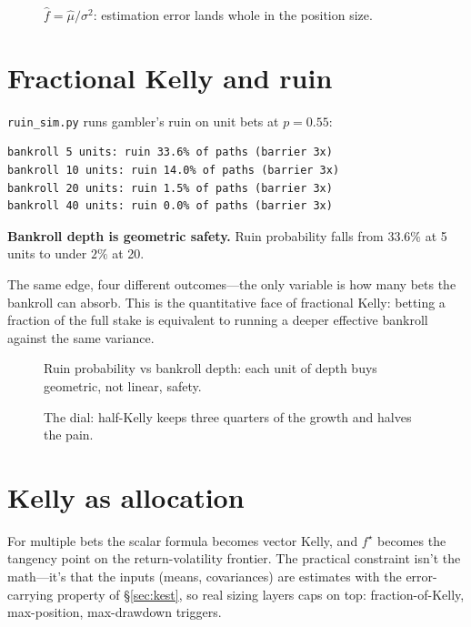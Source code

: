 \begin{figure}[htbp]\centering

\caption{$\hat f=\hat\mu/\sigma^2$: estimation error lands whole in the position size.}
\label{fig:kest}
\end{figure}

\section{Fractional Kelly and ruin}\label{sec:frac}

\texttt{ruin\_sim.py} runs gambler's ruin on unit bets at $p{=}0.55$:
\begin{lstlisting}[numbers=none]
bankroll 5 units: ruin 33.6% of paths (barrier 3x)
bankroll 10 units: ruin 14.0% of paths (barrier 3x)
bankroll 20 units: ruin 1.5% of paths (barrier 3x)
bankroll 40 units: ruin 0.0% of paths (barrier 3x)
\end{lstlisting}

\begin{example}\label{ex:ruin}
\textbf{Bankroll depth is geometric safety.} Ruin probability falls from $33.6\%$ at
5 units to under $2\%$ at 20.
\begin{solution}
The same edge, four different outcomes---the only variable is how many bets the bankroll
can absorb. This is the quantitative face of fractional Kelly: betting a fraction of the
full stake is equivalent to running a deeper effective bankroll against the same variance.
\end{solution}
\end{example}

\begin{figure}[htbp]\centering

\caption{Ruin probability vs bankroll depth: each unit of depth buys geometric, not
linear, safety.}
\label{fig:ruin}
\end{figure}

\begin{figure}[htbp]\centering

\caption{The dial: half-Kelly keeps three quarters of the growth and halves the pain.}
\label{fig:halves}
\end{figure}

\section{Kelly as allocation}\label{sec:kalloc}

For multiple bets the scalar formula becomes vector Kelly, and $f^\star$ becomes the
tangency point on the return-volatility frontier. The practical constraint isn't the
math---it's that the inputs (means, covariances) are estimates with the error-carrying
property of \S\ref{sec:kest}, so real sizing layers caps on top: fraction-of-Kelly,
max-position, max-drawdown triggers.

